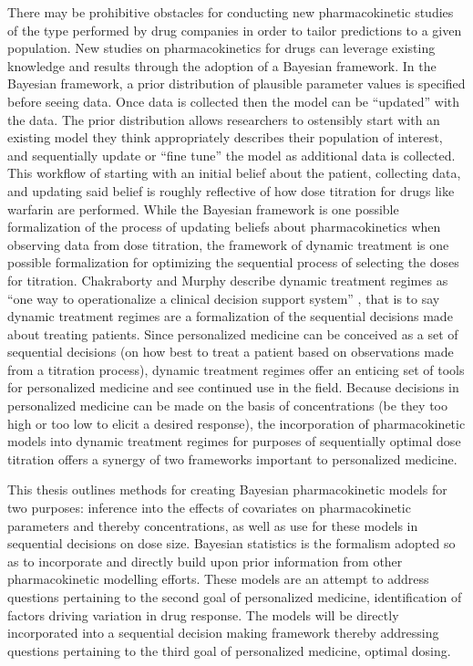 There may be prohibitive obstacles for conducting new pharmacokinetic studies of the type performed by drug companies in order to tailor predictions to a given population. New studies on pharmacokinetics for drugs can leverage existing knowledge and results through the adoption of a Bayesian framework.  In the Bayesian framework, a prior distribution of plausible parameter values is specified before seeing data.  Once data is collected then the model can be ``updated'' with the data.  The prior distribution allows researchers to ostensibly start with an existing model they think appropriately describes their population of interest, and sequentially update or ``fine tune'' the model as additional data is collected. This workflow of starting with an initial belief about the patient, collecting data, and updating said belief is roughly reflective of how dose titration for drugs like warfarin are performed.   While the Bayesian framework is one possible formalization of the process of updating beliefs about pharmacokinetics when observing data from dose titration, the framework of dynamic treatment is one possible formalization for optimizing the sequential process of selecting the doses for titration.  Chakraborty and Murphy describe dynamic treatment regimes as ``one way to operationalize a clinical decision support system'' \cite{chakraborty_dynamic_2014}, that is to say dynamic treatment regimes are a formalization of the sequential decisions made about treating patients.  Since personalized medicine can be conceived as a set of sequential decisions (on how best to treat a patient based on observations made from a titration process), dynamic treatment regimes offer an enticing set of tools for personalized medicine and see continued use in the field.  Because decisions in personalized medicine can be made on the basis of concentrations (be they too high or too low to elicit a desired response), the incorporation of pharmacokinetic models into dynamic treatment regimes for purposes of sequentially optimal dose titration offers a synergy of two frameworks important to personalized medicine.

This thesis outlines methods for creating Bayesian pharmacokinetic models for two purposes: inference into the effects of covariates on pharmacokinetic parameters and thereby concentrations, as well as use for these models in sequential decisions on dose size.    Bayesian statistics is the formalism adopted so as to incorporate and directly build upon prior information from other pharmacokinetic modelling efforts.  These models are an attempt to address questions pertaining to the second goal of personalized medicine, identification of factors driving variation in drug response.  The models will be directly incorporated into a sequential decision making framework thereby addressing questions pertaining to the third goal of personalized medicine, optimal dosing.


